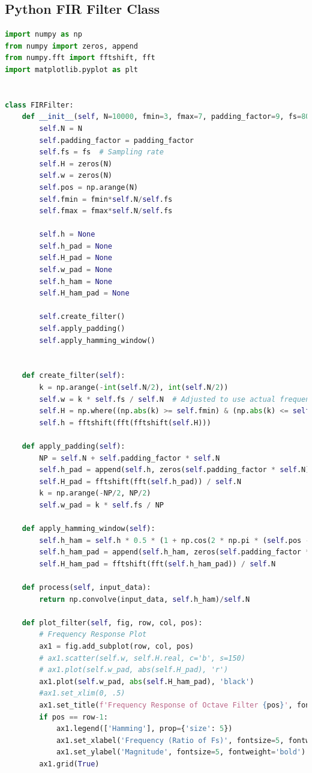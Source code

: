 \documentclass[a4paper, 11pt]{exam}
\begin{document}
\subsection{Python FIR Filter Class}
\begin{lstlisting}[language=Python]
import numpy as np
from numpy import zeros, append
from numpy.fft import fftshift, fft
import matplotlib.pyplot as plt


class FIRFilter:
    def __init__(self, N=10000, fmin=3, fmax=7, padding_factor=9, fs=8000):
        self.N = N
        self.padding_factor = padding_factor
        self.fs = fs  # Sampling rate
        self.H = zeros(N)
        self.w = zeros(N)
        self.pos = np.arange(N)
        self.fmin = fmin*self.N/self.fs
        self.fmax = fmax*self.N/self.fs
        
        self.h = None
        self.h_pad = None
        self.H_pad = None
        self.w_pad = None
        self.h_ham = None
        self.H_ham_pad = None
        
        self.create_filter()
        self.apply_padding()
        self.apply_hamming_window()


    def create_filter(self):
        k = np.arange(-int(self.N/2), int(self.N/2))
        self.w = k * self.fs / self.N  # Adjusted to use actual frequency values
        self.H = np.where((np.abs(k) >= self.fmin) & (np.abs(k) <= self.fmax), 1, 0)
        self.h = fftshift(fft(fftshift(self.H)))

    def apply_padding(self):
        NP = self.N + self.padding_factor * self.N
        self.h_pad = append(self.h, zeros(self.padding_factor * self.N))
        self.H_pad = fftshift(fft(self.h_pad)) / self.N
        k = np.arange(-NP/2, NP/2)
        self.w_pad = k * self.fs / NP

    def apply_hamming_window(self):
        self.h_ham = self.h * 0.5 * (1 + np.cos(2 * np.pi * (self.pos - self.N / 2) / self.N))
        self.h_ham_pad = append(self.h_ham, zeros(self.padding_factor * self.N))
        self.H_ham_pad = fftshift(fft(self.h_ham_pad)) / self.N

    def process(self, input_data):
        return np.convolve(input_data, self.h_ham)/self.N

    def plot_filter(self, fig, row, col, pos):
        # Frequency Response Plot
        ax1 = fig.add_subplot(row, col, pos)
        # ax1.scatter(self.w, self.H.real, c='b', s=150)
        # ax1.plot(self.w_pad, abs(self.H_pad), 'r')
        ax1.plot(self.w_pad, abs(self.H_ham_pad), 'black')
        #ax1.set_xlim(0, .5)
        ax1.set_title(f'Frequency Response of Octave Filter {pos}', fontsize=5, fontweight='bold')
        if pos == row-1:            
            ax1.legend(['Hamming'], prop={'size': 5})
            ax1.set_xlabel('Frequency (Ratio of Fs)', fontsize=5, fontweight='bold')
            ax1.set_ylabel('Magnitude', fontsize=5, fontweight='bold')
        ax1.grid(True)


\end{lstlisting}
\end{document}
